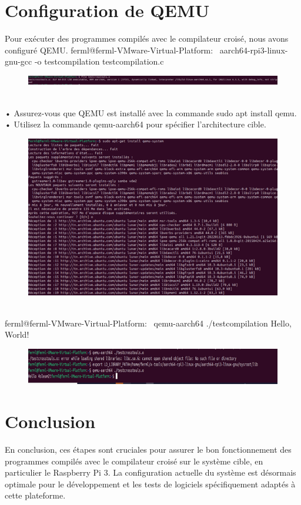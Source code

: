 \section{Configuration de QEMU }
Pour exécuter des programmes compilés avec le compilateur croisé, nous avons configuré QEMU.
ferml@ferml-VMware-Virtual-Platform:~ aarch64-rpi3-linux-gnu-gcc -o testcompilation testcompilation.c
 \begin{figure}[h]
    \includegraphics[width=1\textwidth]{images/22.png}   
\end{figure}
\\•	Assurez-vous que QEMU est installé avec la commande sudo apt install qemu.
\\•	Utilisez la commande qemu-aarch64 pour spécifier l'architecture cible.
 \begin{figure}[h]
    \includegraphics[width=1\textwidth]{images/23.png}   
\end{figure}
\newpage
\\ferml@ferml-VMware-Virtual-Platform:~ qemu-aarch64 ./testcompilation Hello, World!
 \begin{figure}[h]
    \includegraphics[width=1\textwidth]{images/24.png}   
\end{figure}

\section*{Conclusion}

En conclusion, ces étapes sont cruciales pour assurer le bon fonctionnement des programmes compilés avec le compilateur croisé sur le système cible, en particulier le Raspberry Pi 3. La configuration actuelle du système est désormais optimale pour le développement et les tests de logiciels spécifiquement adaptés à cette plateforme.